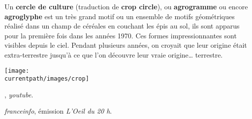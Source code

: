 \vspace*{-5mm}
\begin{changemargin}{-10mm}{-10mm}
   

   \vfill

   \begin{debat}
      Un {\bf cercle de culture} (traduction de {\bf crop circle}), ou {\bf agrogramme} ou encore {\bf agroglyphe} est un très grand motif ou un ensemble de motifs géométriques réalisé dans un champ de céréales en couchant les épis au sol, ils sont apparus pour la première fois dans les années 1970. Ces formes impressionnantes sont visibles depuis le ciel. Pendant plusieurs années, on croyait que leur origine était extra-terrestre jusqu'à ce que l'on découvre leur vraie origine\dots{} terrestre.
      \begin{center} 
         \texttt{[image: \\currentpath/images/crop]}
      \end{center}
      \bigskip
      \begin{cadre}[B2][F4]
         \begin{center}        
         , {\it youtube}.

         \vspace*{2mm}
         
         \vspace*{2mm}
         {\it franceinfo}, émission {\it L'Oeil du 20 h}.
         \end{center}
      \end{cadre}
   \end{debat}
\end{changemargin}